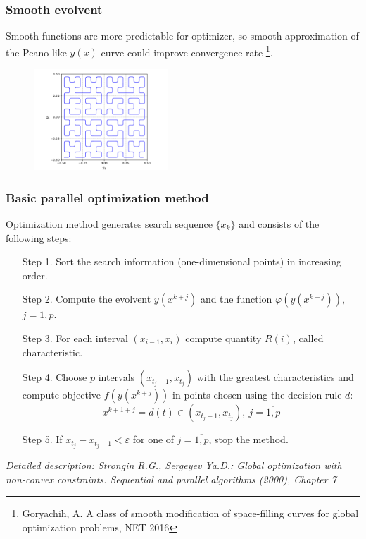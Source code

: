 \documentclass[aspectratio=1610]{beamer}
\begin{document}
\begin{frame}
  \frametitle{Smooth evolvent}
  Smooth functions are more predictable for optimizer, so smooth approximation of the Peano-like \(y(x)\) curve could improve convergence rate \footnote{Goryachih, A. A class of smooth modification of space-filling curves for global optimization problems, NET 2016}.
  \begin{figure}[ht]
    \includegraphics[width=0.45\textwidth]{smooth.pdf}
  \end{figure}

\end{frame}

\begin{frame}
  \frametitle{Basic parallel optimization method}
  Optimization method generates search sequence \(\{x_k\}\) and consists of the following steps:
  \begin{enumerate}
    \setlength{\itemindent}{.1in}
    \item[Step 1.] Sort the search information (one-dimensional points) in increasing order.
    \item[Step 2.] Compute the evolvent \(y(x^{k+j})\) and the function \(\varphi(y(x^{k+j}))\), \(j=\overline{1,p}\).
    \item[Step 3.] For each interval \((x_{i-1}, x_i)\) compute quantity \(R(i)\), called characteristic.
    \item[Step 4.] Choose \(p\) intervals \((x_{t_j-1}, x_{t_j})\) with the greatest characteristics and
    compute objective \(f(y(x^{k+j}))\) in points chosen using the decision rule \(d\):
    \begin{displaymath}
      x^{k+1+j}=d(t)\in (x_{t_j-1}, x_{t_j}),\:j=\overline{1,p}
    \end{displaymath}
    \item[Step 5.] If \(x_{t_j}-x_{t_j-1}<\varepsilon\) for one of \(j=\overline{1,p}\), stop the method.
  \end{enumerate}
  \textit{\footnotesize	{Detailed description: Strongin R.G., Sergeyev Ya.D.: Global optimization with non-convex constraints. Sequential and parallel algorithms (2000), Chapter 7}}
\end{frame}
\end{document}
